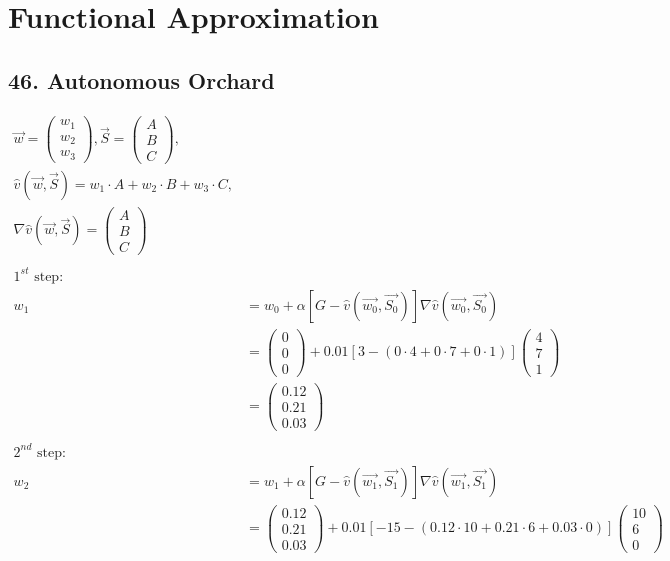 \documentclass[10pt,a4paper]{article}
\author{Johannes Ender}
\begin{document}
\section{Functional Approximation}
\subsection*{46. Autonomous Orchard}
\begin{align*}
\vec{w} = \begin{pmatrix} w_1 \\ w_2 \\ w_3\end{pmatrix}, \vec{S}=\begin{pmatrix} A \\ B \\ C\end{pmatrix},\\ \hat{v}(\vec{w}, \vec{S}) = w_1 \cdot A + w_2 \cdot B + w_3 \cdot C,\\ \nabla \hat{v}(\vec{w}, \vec{S}) = \begin{pmatrix} A \\ B \\ C\end{pmatrix} \\ \\
\text{$1^{st}$ step:}\\
w_1 &= w_0 + \alpha [G - \hat{v}(\vec{w_0}, \vec{S_0})]\nabla \hat{v}(\vec{w_0}, \vec{S_0}) \\
&= \begin{pmatrix} 0 \\ 0 \\ 0\end{pmatrix} + 0.01 [3 - (0\cdot 4 + 0 \cdot 7 + 0 \cdot 1)]\begin{pmatrix} 4 \\ 7 \\ 1\end{pmatrix} \\
&= \begin{pmatrix} 0.12 \\ 0.21 \\ 0.03\end{pmatrix} \\ \\
\text{$2^{nd}$ step:}\\
w_2 &= w_1 + \alpha [G - \hat{v}(\vec{w_1}, \vec{S_1})]\nabla \hat{v}(\vec{w_1}, \vec{S_1}) \\
&= \begin{pmatrix} 0.12 \\ 0.21 \\ 0.03\end{pmatrix} + 0.01 [-15 - (0.12\cdot 10 + 0.21 \cdot 6 + 0.03 \cdot 0)]\begin{pmatrix} 10 \\ 6 \\ 0\end{pmatrix} \\

\end{align*}
\end{document}
